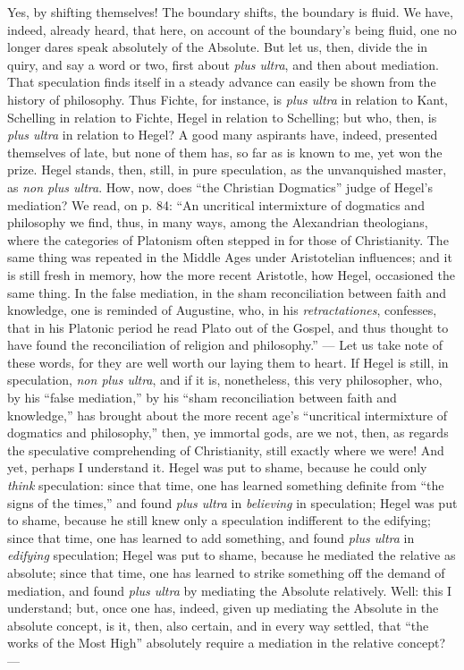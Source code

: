 \documentclass[12pt]{book}
\begin{document}
Yes, by shifting themselves! The boundary shifts, the boundary is fluid. We have, indeed, already heard, that here, on account of the boundary's being fluid, one no longer dares speak absolutely of the Absolute. But let us, then, divide the in\-%
quiry, and say a word or two, first about \textit{plus ultra}, and then about mediation. That speculation finds itself in a steady advance can easily be shown from the history of philosophy. Thus Fichte, for instance, is \textit{plus ultra} in relation to Kant, Schelling in relation to Fichte, Hegel in relation to Schelling; but who, then, is \textit{plus ultra} in relation to Hegel? A good many aspirants have, indeed, presented themselves of late, but none of them has, so far as is known to me, yet won the prize. Hegel stands, then, still, in pure speculation, as the unvanquished master, as \textit{non plus ultra}. How, now, does ``the Christian Dogmatics'' judge of Hegel's mediation? We read, on p. 84: ``An uncritical intermixture of dogmatics and philosophy we find, thus, in many ways, among the Alexandrian theologians, where the categories of Platonism often stepped in for those of Christianity. The same thing was repeated in the Middle Ages under Aristotelian influences; and it is still fresh in memory, how the more recent Aristotle, how Hegel, occasioned the same thing. In the false mediation, in the sham reconciliation between faith and knowledge, one is reminded of Augustine, who, in his \textit{retractationes}, confesses, that in his Platonic period he read Plato out of the Gospel, and thus thought to have found the reconciliation of religion and philosophy.'' --- Let us take note of these words, for they are well worth our laying them to heart. If Hegel is still, in speculation, \textit{non plus ultra}, and if it is, nonetheless, this very philosopher, who, by his
``false mediation,'' by his ``sham reconciliation between faith and knowledge,'' has brought about the more recent age's ``uncritical intermixture of dogmatics and philosophy,'' then, ye immortal gods, are we not, then, as regards the speculative comprehending of Christianity, still exactly where we were! And yet, perhaps I understand it. Hegel was put to shame, because he could only \emph{think} speculation: since that time, one has learned something definite from ``the signs of the times,'' and found \textit{plus ultra} in \emph{believing} in speculation; Hegel was put to shame, because he still knew only a speculation indifferent to the edifying; since that time, one has learned to add something, and found \textit{plus ultra} in \emph{edifying} speculation; Hegel was put to shame, because he mediated the relative as absolute; since that time, one has learned to strike something off the demand of mediation, and found \textit{plus ultra} by mediating the Absolute relatively. Well: this I understand; but, once one has, indeed, given up mediating the Absolute in the absolute concept, is it, then, also certain, and in every way settled, that ``the works of the Most High'' absolutely require a mediation in the relative concept? ---
\end{document}
